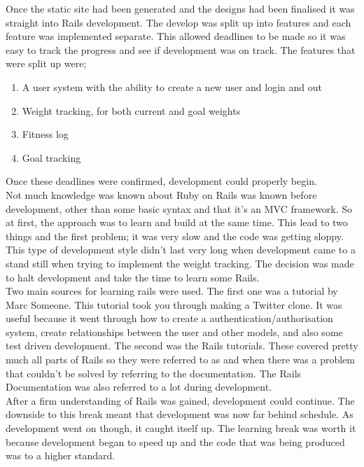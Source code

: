Once the static site had been generated and the designs had been finalised it was straight into Rails development. The develop was split up into features and each feature was implemented separate. This allowed deadlines to be made so it was easy to track the progress and see if development was on track. The features that were split up were;

\begin{enumerate}
\item A user system with the ability to create a new user and login and out
\item Weight tracking, for both current and goal weights
\item Fitness log
\item Goal tracking
\end{enumerate}

\noindent
Once these deadlines were confirmed, development could properly begin.\\

Not much knowledge was known about Ruby on Rails was known before development, other than some basic syntax and that it's an MVC framework. So at first, the approach was to learn and build at the same time. This lead to two things and the first problem; it was very slow and the code was getting sloppy. This type of development style didn't last very long when development came to a stand still when trying to implement the weight tracking. The decision was made to halt development and take the time to learn some Rails.\\

Two main sources for learning rails were used. The first one was a tutorial by Marc Someone. This tutorial took you through making a Twitter \citep{twitter:2006} clone. It was useful because it went through how to create a authentication/authorisation system, create relationships between the user and other models, and also some test driven development. The second was the Rails tutorials. These covered pretty much all parts of Rails so they were referred to as and when there was a problem that couldn't be solved by referring to the documentation. The Rails Documentation was also referred to a lot during development.\\

After a firm understanding of Rails was gained, development could continue. The downside to this break meant that development was now far behind schedule. As development went on though, it caught itself up. The learning break was worth it because development began to speed up and the code that was being produced was to a higher standard.\\

